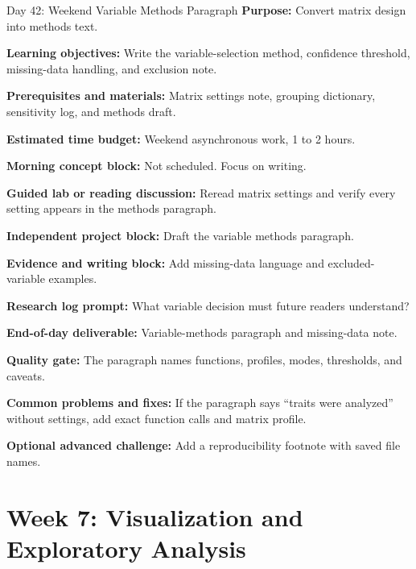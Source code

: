 \begin{dailybox}{Day 42: Weekend Variable Methods Paragraph}
\textbf{Purpose:} Convert matrix design into methods text.

\textbf{Learning objectives:} Write the variable-selection method, confidence threshold, missing-data handling, and exclusion note.

\textbf{Prerequisites and materials:} Matrix settings note, grouping dictionary, sensitivity log, and methods draft.

\textbf{Estimated time budget:} Weekend asynchronous work, 1 to 2 hours.

\textbf{Morning concept block:} Not scheduled. Focus on writing.

\textbf{Guided lab or reading discussion:} Reread matrix settings and verify every setting appears in the methods paragraph.

\textbf{Independent project block:} Draft the variable methods paragraph.

\textbf{Evidence and writing block:} Add missing-data language and excluded-variable examples.

\textbf{Research log prompt:} What variable decision must future readers understand?

\textbf{End-of-day deliverable:} Variable-methods paragraph and missing-data note.

\textbf{Quality gate:} The paragraph names functions, profiles, modes, thresholds, and caveats.

\textbf{Common problems and fixes:} If the paragraph says ``traits were analyzed'' without settings, add exact function calls and matrix profile.

\textbf{Optional advanced challenge:} Add a reproducibility footnote with saved file names.
\end{dailybox}

\section{Week 7: Visualization and Exploratory Analysis}

